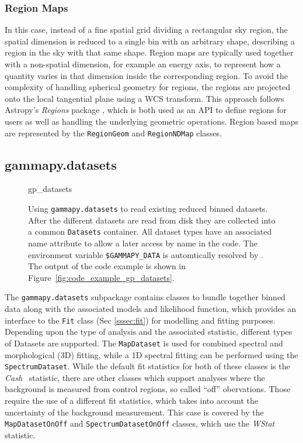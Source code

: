 \documentclass[longauth]{aa}
\newcommand{\code}[1]{\texttt{#1}}
\begin{document}
\subsubsection{Region Maps}
In this case, instead of a fine spatial grid
dividing a rectangular sky region, the spatial dimension is reduced to a single
bin with an arbitrary shape, describing a region in the sky with that same
shape. Region maps are typically used together with a non-spatial dimension, for
example an energy axis, to represent how a quantity varies in that dimension
inside the corresponding region. To avoid the complexity of handling
spherical geometry for regions, the regions are projected onto the local
tangential plane using a WCS transform. This approach follows Astropy's \textit{Regions}
package \citep{AstropyRegions2022}, which is both used as an API to define regions
for users as well as handling the underlying geometric operations. Region based
maps are represented by the \code{RegionGeom} and \code{RegionNDMap} classes.


\subsection{gammapy.datasets}
\label{ssec:gammapy-datasets}
%
\begin{figure}
	\small
	{gp_datasets}
	\caption{
        Using \code{gammapy.datasets} to read existing reduced binned datasets.
        After the different datasets are read from disk they are collected into a
        common \code{Datasets} container. All dataset types have an associated
        name attribute to allow a later access by name in the code. The
        environment variable \code{\$GAMMAPY\_DATA} is automtically resolved
        by \gammapy. The output
		of the code example is shown in Figure~\ref{fig:code_example_gp_datasets}.
    }
	\label{fig*:minted:gp_datasets}
\end{figure}
%
The \code{gammapy.datasets} subpackage contains classes to bundle
together binned data along with the associated models and likelihood function, which
provides an interface to the \code{Fit} class (Sec \ref{sssec:fit}) for
modelling and fitting purposes. Depending upon the type of analysis and the
associated statistic, different types of Datasets are supported. The \code{MapDataset} is
used for combined spectral and morphological (3D) fitting, while a 1D spectral 
fitting can be performed using the \code{SpectrumDataset}.
While the default fit statistics for both of these classes is the \emph{Cash}~\citep{Cash}
statistic, there are other classes which support
analyses where the background is measured from control regions, so called \enquote{off} obervations.
Those require the use of a different fit statistics, which takes into account the
uncertainty of the background measurement. This case is covered by the \code{MapDatasetOnOff}
and \code{SpectrumDatasetOnOff} classes, which use the \emph{WStat}~\citep{WStat} statistic.
\end{document}
